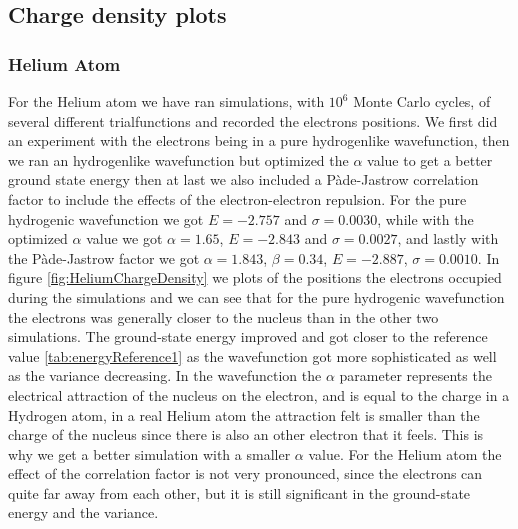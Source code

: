 \subsection{Charge density plots}
	\subsubsection{Helium Atom}
		For the Helium atom we have ran simulations, with \(10^6\) Monte Carlo cycles, of several different trialfunctions and recorded the electrons positions. We first did an experiment with the electrons being in a pure hydrogenlike wavefunction, then we ran an hydrogenlike wavefunction but optimized the \(\alpha \) value to get a better ground state energy then at last we also included a Pàde-Jastrow correlation factor to include the effects of the electron-electron repulsion. For the pure hydrogenic wavefunction we got $E = -2.757$ and $\sigma = 0.0030$, while with the optimized \(\alpha\) value we got $\alpha = 1.65$, $E = -2.843$ and $\sigma = 0.0027$, and lastly with the Pàde-Jastrow factor we got $\alpha = 1.843$, $\beta = 0.34$, $E = -2.887$, $\sigma = 0.0010$. In figure \ref{fig:HeliumChargeDensity} we plots of the positions the electrons occupied during the simulations and we can see that for the pure hydrogenic wavefunction the electrons was generally closer to the nucleus than in the other two simulations. The ground-state energy improved and got closer to the reference value \ref{tab:energyReference1} as the wavefunction got more sophisticated as well as the variance decreasing. In the wavefunction the $\alpha$ parameter represents the electrical attraction of the nucleus on the electron, and is equal to the charge in a Hydrogen atom, in a real Helium atom the attraction felt is smaller than the charge of the nucleus since there is also an other electron that it feels. This is why we get a better simulation with a smaller \(\alpha\) value. For the Helium atom the effect of the correlation factor is not very pronounced, since the electrons can quite far away from each other, but it is still significant in the ground-state energy and the variance.
